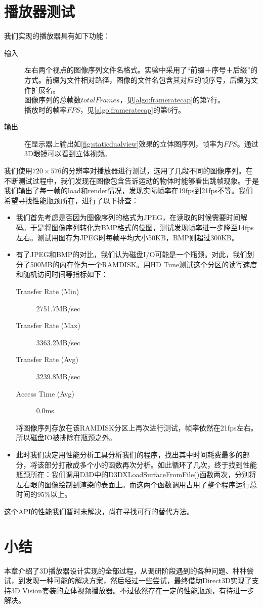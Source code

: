 \section{播放器测试}
\label{sec:3dplayerdemo}

我们实现的播放器具有如下功能：
\begin{description}
\item[输入] 左右两个视点的图像序列文件名格式。实验中采用了“前缀＋序号＋后缀”的方式。前缀为文件相对路径，图像的文件名包含其对应的帧序号，后缀为文件扩展名。\\
	图像序列的总帧数$totalFrames$，见\autoref{algo:frameratecap}的第7行。\\
	播放时的帧率$FPS$，见\autoref{algo:frameratecap}的第6行。
\item[输出] 在显示器上输出如\autoref{fig:staticdualview}效果的立体图序列，帧率为$FPS$。通过3D眼镜可以看到立体视频。
\end{description}


我们使用$720\times576$的分辨率对播放器进行测试，选用了几段不同的图像序列。在不断测试过程中，我们发现在图像包含告诉运动的物体时能够看出跳帧现象。于是我们输出了每一帧的load和render情况，发现实际帧率在19fps到21fps不等。我们希望寻找性能瓶颈所在，进行了以下排查：
\begin{itemize}
\item 我们首先考虑是否因为图像序列的格式为JPEG，在读取的时候需要时间解码。于是将图像序列转化为BMP格式的位图，测试发现帧率进一步降至14fps左右。测试用图存为JPEG时每帧平均大小50KB，BMP则超过300KB。
\item 有了JPEG和BMP的对比，我们认为磁盘I/O可能是一个瓶颈。对此，我们划分了500MB的内存作为一个RAMDISK。用HD Tune测试这个分区的读写速度和随机访问时间等指标如下：
\begin{description}
\item[Transfer Rate (Min)] 2751.7MB/sec
\item[Transfer Rate (Max)] 3363.2MB/sec
\item[Transfer Rate (Avg)] 3239.8MB/sec
\item[Access Time (Avg)] 0.0ms
\end{description}
将图像序列存放在该RAMDISK分区上再次进行测试，帧率依然在21fps左右。所以磁盘IO被排除在瓶颈之外。
\item 此时我们决定用性能分析工具分析我们的程序，找出其中时间耗费最多的部分，将该部分打散成多个小的函数再次分析。如此循环了几次，终于找到性能瓶颈所在：我们调用D3D中的D3DXLoadSurfaceFromFile()函数两次，分别将左右眼的图像绘制到渲染的表面上。而这两个函数调用占用了整个程序运行总时间的95\%以上。
\end{itemize}
这个API的性能我们暂时未解决，尚在寻找可行的替代方法。


\section{小结}
\label{sec:sum7}

本章介绍了3D播放器设计实现的全部过程，从调研阶段遇到的各种问题、种种尝试，到发现一种可能的解决方案，然后经过一些尝试，最终借助Direct3D实现了支持3D Vision套装的立体视频播放器。不过依然存在一定的性能瓶颈，有待进一步解决。


